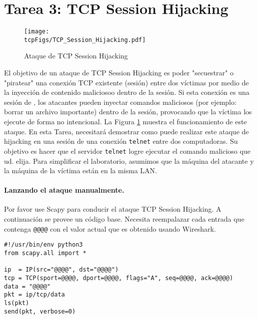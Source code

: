             


\section{Tarea 3: TCP Session Hijacking}



\begin{figure}[htb]
  \begin{center}
    \texttt{[image: \\tcpFigs/TCP\_Session\_Hijacking.pdf]}
  \end{center}
  \caption{Ataque de TCP Session Hijacking}
  \label{tcp:fig:hijacking}
\end{figure}
 
El objetivo de un ataque de TCP Session Hijacking es poder "secuestrar" o "piratear" una conexión TCP existente (sesión) entre dos víctimas por medio de la inyección de contenido maliciosoo dentro de la sesión. Si esta conexión es una sesión de \telnet, los atacantes pueden inyectar comandos maliciosos (por ejemplo: borrar un archivo importante) dentro de la sesión, provocando que la víctima los ejecute de forma no intencional. La Figura \ref{tcp:fig:hijacking} muestra el funcionamiento de este ataque.
En esta Tarea, necesitará demostrar como puede realizar este ataque de hijacking en una sesión de una conexión \texttt{telnet} entre dos computadoras. Su objetivo es hacer que el servidor \texttt{telnet} logre ejecutar el comando malicioso que ud. elija.
Para simplificar el laboratorio, asumimos que la máquina del atacante y la máquina de la víctima están en la misma LAN.


\paragraph{Lanzando el ataque manualmente.}
Por favor use Scapy para conducir el ataque TCP Session Hijacking.
A continuación se provee un código base. Necesita reempalazar cada entrada que contenga \texttt{@@@@} con el valor actual que es obtenido usando Wireshark.

\begin{lstlisting}
#!/usr/bin/env python3
from scapy.all import *

ip  = IP(src="@@@@", dst="@@@@")
tcp = TCP(sport=@@@@, dport=@@@@, flags="A", seq=@@@@, ack=@@@@)
data = "@@@@"
pkt = ip/tcp/data
ls(pkt)
send(pkt, verbose=0)
\end{lstlisting}


